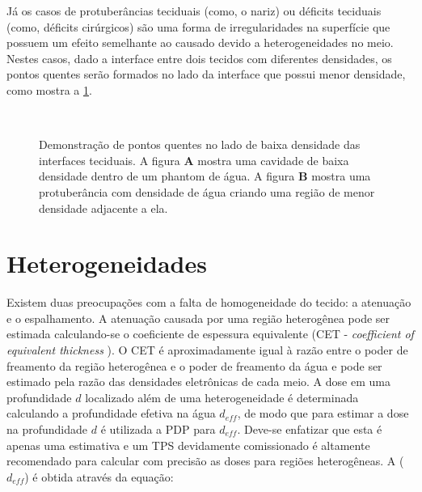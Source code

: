 \documentclass[11pt,a4paper]{article}
\begin{document}
	Já os casos de protuberâncias teciduais (como, o nariz) ou déficits teciduais (como, déficits cirúrgicos) são uma forma de irregularidades na superfície que possuem um efeito semelhante ao causado devido a heterogeneidades no meio. Nestes casos, dado a interface entre dois tecidos com diferentes densidades, os pontos quentes serão formados no lado da interface que possui menor densidade, como mostra a \ref{fig:hotspots}.
	
	\begin{figure}[h]
		\centering
		 \\ %
		\caption{Demonstração de pontos quentes no lado de baixa densidade das interfaces teciduais. A figura \textbf{A} mostra uma cavidade de baixa densidade dentro de um phantom de água. A figura \textbf{B} mostra uma protuberância com densidade de água criando uma região de menor densidade adjacente a ela.}
		\label{fig:hotspots}
	\end{figure}


\section{Heterogeneidades}

	Existem duas preocupações com a falta de homogeneidade do tecido: a atenuação e o espalhamento. A atenuação causada por uma região heterogênea pode ser estimada calculando-se o coeficiente de espessura equivalente (CET - \textit{ coefficient of equivalent thickness} ). O CET é aproximadamente igual à razão entre o poder de freamento da região heterogênea e o poder de freamento da água e pode ser estimado pela razão das densidades eletrônicas de cada meio. A dose em uma profundidade $d$ localizado além de uma heterogeneidade é determinada calculando a profundidade efetiva na água $d_{eff}$, de modo que para estimar a dose na profundidade $d$ é utilizada a PDP para $d_{eff}$. Deve-se enfatizar que esta é apenas uma estimativa e um TPS devidamente comissionado é altamente recomendado para calcular com precisão as doses para regiões heterogêneas. A ($d_{eff}$) é obtida através da equação:
\end{document}
